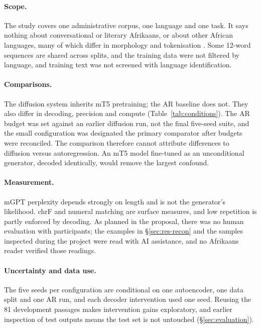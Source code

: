 \documentclass[11pt,a4paper]{article}
\begin{document}
\paragraph{Scope.}
The study covers one administrative corpus, one language and one task. It says nothing about conversational or literary Afrikaans, or about other African languages, many of which differ in morphology and tokenisation \citep{lundin2025token}. Some 12-word sequences are shared across splits, and the training data were not filtered by language, and training text was not screened with language identification.

\paragraph{Comparisons.}
The diffusion system inherits mT5 pretraining; the AR baseline does not. They also differ in decoding, precision and compute (Table~\ref{tab:conditions}). The AR budget was set against an earlier diffusion run, not the final five-seed suite, and the small configuration was designated the primary comparator after budgets were reconciled. The comparison therefore cannot attribute differences to diffusion versus autoregression. An mT5 model fine-tuned as an unconditional generator, decoded identically, would remove the largest confound.

\paragraph{Measurement.}
mGPT perplexity depends strongly on length and is not the generator's likelihood. chrF and numeral matching are surface measures, and low repetition is partly enforced by decoding. As planned in the proposal, there was no human evaluation with participants; the examples in \S\ref{sec:res-recon} and the samples inspected during the project were read with AI assistance, and no Afrikaans reader verified those readings.

\paragraph{Uncertainty and data use.}
The five seeds per configuration are conditional on one autoencoder, one data split and one AR run, and each decoder intervention used one seed. Reusing the 81 development passages makes intervention gains exploratory, and earlier inspection of test outputs means the test set is not untouched (\S\ref{sec:evaluation}).
\end{document}
